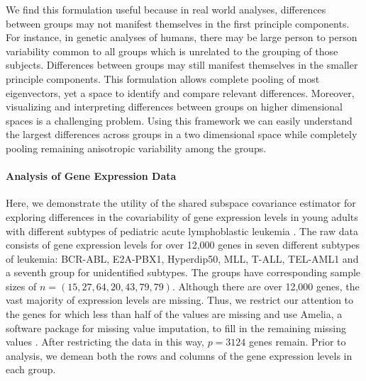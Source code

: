 \documentclass[12pt]{article}
\begin{document}
We find this formulation useful because in real world analyses,
differences between groups may not manifest themselves in the first
principle components.  For instance, in genetic analyses of humans,
there may be large person to person variability common to all groups
which is unrelated to the grouping of those subjects. Differences
between groups may still manifest themselves in the smaller principle
components. This formulation allows complete pooling of most
eigenvectors, yet a space to identify and compare relevant
differences.  Moreover, visualizing and interpreting differences
between groups on higher dimensional spaces is a challenging problem.
Using this framework we can easily understand the largest differences
across groups in a two dimensional space while completely pooling
remaining anisotropic variability among the groups.

\paragraph{Analysis of Gene Expression Data}

Here, we demonstrate the utility of the shared subspace covariance
estimator for exploring differences in the covariability of gene
expression levels in young adults with different subtypes of pediatric
acute lymphoblastic leukemia \citep{Yeoh2002}.  The raw data consists
of gene expression levels for over 12,000 genes in seven different
subtypes of leukemia: BCR-ABL, E2A-PBX1, Hyperdip50, MLL, T-ALL,
TEL-AML1 and a seventh group for unidentified subtypes.  The groups
have corresponding sample sizes of $n = (15, 27, 64, 20, 43, 79, 79)$.
Although there are over 12,000 genes, the vast majority of expression
levels are missing.  Thus, we restrict our attention to the genes for
which less than half of the values are missing and use Amelia, a
software package for missing value imputation, to fill in the
remaining missing values \citep{Amelia}.  After restricting the data
in this way, $p=3124$ genes remain.  Prior to analysis, we demean both
the rows and columns of the gene expression levels in each group.
\end{document}
